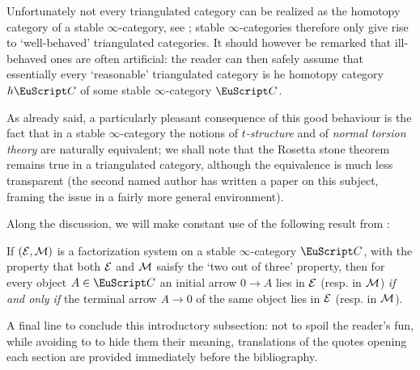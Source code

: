 {Unfortunately not every triangulated category can be realized as the homotopy category of a stable $\infty$-category, see \cite{MR2342636}; stable $\infty$-categories therefore only give rise to `well\hyp{}behaved' triangulated categories. It should however be remarked that ill\hyp{}behaved ones are often artificial: the reader can then safely assume that essentially every `reasonable' triangulated category is he homotopy category $h\C$ of some stable $\infty$-category $\C$.

As already said, a particularly pleasant consequence of this good behaviour is the fact that in a stable $\infty$-category the notions of \emph{$t$-structure} \cite{BBDPervers} and of \emph{normal torsion theory} \cite{CHK} are naturally equivalent; we shall note that the Rosetta stone theorem remains true in a triangulated category, although the equivalence is much less transparent (the second named author has written a paper \cite{tderiv} on this subject, framing the issue in a fairly more general environment). 

Along the discussion, we will make constant use of the following result from \cite{Fiorenza2014}:
\begin{lemma*}
If $(\mathcal{E},\mathcal{M})$ is a factorization system on a stable $\infty$-category $\C$, with the property that both $\mathcal{E}$ and $\mathcal{M}$ saisfy the `two out of three' property, then for every object $A\in\C$ an initial arrow $0\to A$ lies in $\mathcal{E}$ (resp. in $\mathcal{M}$) \emph{if and only if} the terminal arrow $A\to 0$ of the same object lies in $\mathcal{E}$ (resp. in $\mathcal{M}$).
\end{lemma*}
A final line to conclude this introductory subsection: not to spoil the reader's fun, while avoiding to to hide them their meaning, translations of the quotes opening each section are provided immediately before the bibliography.
}